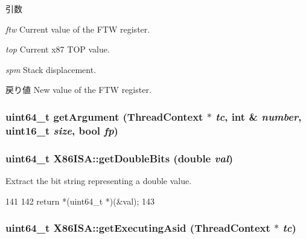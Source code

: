 \begin{DoxyParams}{引数}
\item[{\em ftw}]Current value of the FTW register. \item[{\em top}]Current x87 TOP value. \item[{\em spm}]Stack displacement. \end{DoxyParams}
\begin{DoxyReturn}{戻り値}
New value of the FTW register. 
\end{DoxyReturn}
\hypertarget{namespaceX86ISA_a3f9560369e934be05b1dd8f23fbd6104}{
\subsubsection[{getArgument}]{\setlength{\rightskip}{0pt plus 5cm}uint64\_\-t getArgument ({\bf ThreadContext} $\ast$ {\em tc}, \/  int \& {\em number}, \/  uint16\_\-t {\em size}, \/  bool {\em fp})}}
\label{namespaceX86ISA_a3f9560369e934be05b1dd8f23fbd6104}
\hypertarget{namespaceX86ISA_adaa2c2b77aafbc287d8624f8775f9fee}{
\subsubsection[{getDoubleBits}]{\setlength{\rightskip}{0pt plus 5cm}uint64\_\-t X86ISA::getDoubleBits (double {\em val})}}
\label{namespaceX86ISA_adaa2c2b77aafbc287d8624f8775f9fee}
Extract the bit string representing a double value. 


\begin{DoxyCode}
141                                               {
142         return *(uint64_t *)(&val);
143     }
\end{DoxyCode}
\hypertarget{namespaceX86ISA_a8515a02a584a55f928e9bd214b441632}{
\subsubsection[{getExecutingAsid}]{\setlength{\rightskip}{0pt plus 5cm}uint64\_\-t X86ISA::getExecutingAsid ({\bf ThreadContext} $\ast$ {\em tc})}}
\label{namespaceX86ISA_a8515a02a584a55f928e9bd214b441632}



